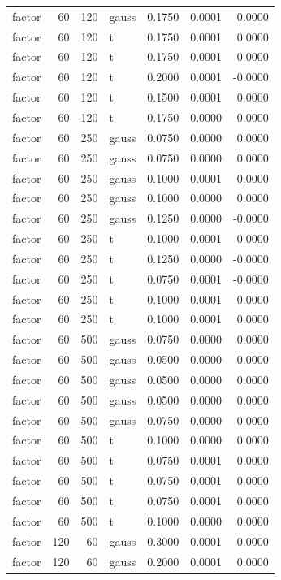 \begin{tabular}{lrrlrrr}
factor & 60 & 120 & gauss & 0.1750 & 0.0001 & 0.0000 \\
factor & 60 & 120 & t & 0.1750 & 0.0001 & 0.0000 \\
factor & 60 & 120 & t & 0.1750 & 0.0001 & 0.0000 \\
factor & 60 & 120 & t & 0.2000 & 0.0001 & -0.0000 \\
factor & 60 & 120 & t & 0.1500 & 0.0001 & 0.0000 \\
factor & 60 & 120 & t & 0.1750 & 0.0000 & 0.0000 \\
factor & 60 & 250 & gauss & 0.0750 & 0.0000 & 0.0000 \\
factor & 60 & 250 & gauss & 0.0750 & 0.0000 & 0.0000 \\
factor & 60 & 250 & gauss & 0.1000 & 0.0001 & 0.0000 \\
factor & 60 & 250 & gauss & 0.1000 & 0.0000 & 0.0000 \\
factor & 60 & 250 & gauss & 0.1250 & 0.0000 & -0.0000 \\
factor & 60 & 250 & t & 0.1000 & 0.0001 & 0.0000 \\
factor & 60 & 250 & t & 0.1250 & 0.0000 & -0.0000 \\
factor & 60 & 250 & t & 0.0750 & 0.0001 & -0.0000 \\
factor & 60 & 250 & t & 0.1000 & 0.0001 & 0.0000 \\
factor & 60 & 250 & t & 0.1000 & 0.0001 & 0.0000 \\
factor & 60 & 500 & gauss & 0.0750 & 0.0000 & 0.0000 \\
factor & 60 & 500 & gauss & 0.0500 & 0.0000 & 0.0000 \\
factor & 60 & 500 & gauss & 0.0500 & 0.0000 & 0.0000 \\
factor & 60 & 500 & gauss & 0.0500 & 0.0000 & 0.0000 \\
factor & 60 & 500 & gauss & 0.0750 & 0.0000 & 0.0000 \\
factor & 60 & 500 & t & 0.1000 & 0.0000 & 0.0000 \\
factor & 60 & 500 & t & 0.0750 & 0.0001 & 0.0000 \\
factor & 60 & 500 & t & 0.0750 & 0.0001 & 0.0000 \\
factor & 60 & 500 & t & 0.0750 & 0.0001 & 0.0000 \\
factor & 60 & 500 & t & 0.1000 & 0.0000 & 0.0000 \\
factor & 120 & 60 & gauss & 0.3000 & 0.0001 & 0.0000 \\
factor & 120 & 60 & gauss & 0.2000 & 0.0001 & 0.0000 \\

\end{tabular}

